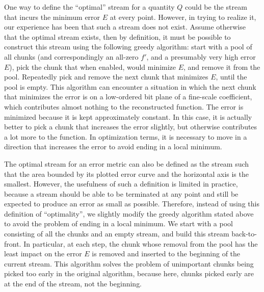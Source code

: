 One way to define the ``optimal'' stream for a quantity $Q$ could be the stream that incurs the
minimum error $E$ at every point. However, in trying to realize it, our experience has been that
such a stream does not exist. Assume otherwise that the optimal stream exists, then by definition,
it must be possible to construct this stream using the following greedy algorithm: start with a pool of all chunks (and
correspondingly an all-zero $f'$, and a presumably very high error $E$), pick the
chunk that when enabled, would minimize $E$, and remove it from the pool. Repeatedly pick and remove
the next chunk that minimizes $E$, until the pool is empty. This algorithm can encounter a situation
in which the next chunk that minimizes the error is on a low-ordered bit plane of a fine-scale
coefficient, which contributes almost nothing to the reconstructed function. The error is minimized
because it is kept approximately constant. In this case, it is actually better to pick a chunk that
increases the error slightly, but otherwise contributes a lot more to the function. In optimization
terms, it is necessary to move in a direction that increases the error to avoid ending in a local
minimum.

The optimal stream for an error metric can also be defined as the stream such that the area bounded
by its plotted error curve and the horizontal axis is the smallest. However, the usefulness of such
a definition is limited in practice, because a stream should be able to be terminated at any point
and still be expected to produce an error as small as possible. Therefore, instead of using this
definition of ``optimality'', we slightly modify the greedy algorithm stated above to avoid the
problem of ending in a local minimum. We start with a pool consisting of all the chunks and an empty
stream, and build this stream back-to-front. In particular, at each step, the chunk whose removal
from the pool has the least impact on the error $E$ is removed and inserted to the beginning of the
current stream. This algorithm solves the problem of unimportant chunks being picked too early in
the original algorithm, because here, chunks picked early are at the end of the stream, not the
beginning.

